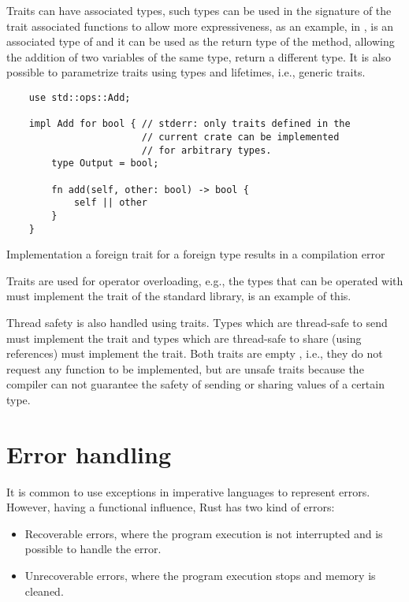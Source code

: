 Traits can have associated types, such types can be used in the signature of the
trait associated functions to allow more expressiveness, as an example, in
,  is an associated type of
 and it can be used as the return type of the  method,
allowing the addition of two variables of the same type, return a different
type. It is also possible to parametrize traits using types and lifetimes, i.e.,
generic traits.

\begin{listing}[h]
	\begin{verbatim}
    use std::ops::Add;

    impl Add for bool { // stderr: only traits defined in the
                        // current crate can be implemented 
                        // for arbitrary types.
        type Output = bool;
        
        fn add(self, other: bool) -> bool {
            self || other
        }
    }
    \end{verbatim}
  \caption{Implementation a foreign trait for a foreign type results in a compilation error}
  \label{lst:foreign_trait_foreign_impl}
\end{listing}

Traits are used for operator overloading, e.g., the types that can be operated
with \inrust{+} must implement the  trait of the standard library,
 is an example of this. 

Thread safety is also handled using traits. Types which are thread-safe to send
must implement the  trait and types which are thread-safe to share
(using references) must implement the  trait. Both traits are empty
, i.e., they do not request any function to be implemented, but are unsafe
traits because the compiler can not guarantee the safety of sending or sharing
values of a certain type.

\section{Error handling}

It is common to use exceptions in imperative languages to represent errors.
However, having a functional influence, Rust has two kind of errors: 

\begin{itemize}
    \item Recoverable errors, where the program execution is not interrupted and
        is possible to handle the error.
    \item Unrecoverable errors, where the program execution stops and memory is
        cleaned.
\end{itemize}

